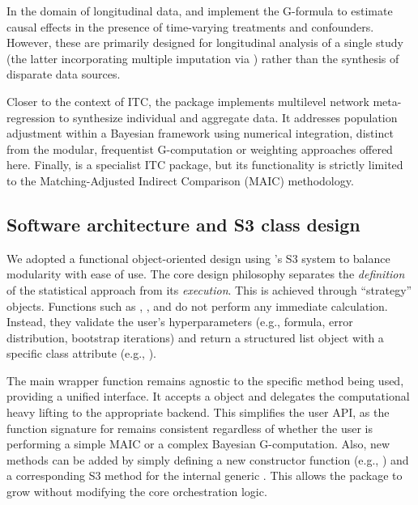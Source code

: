 \documentclass[article]{jss}
\begin{document}
In the domain of longitudinal data,  \citep{sjolander2023gformula} and  \citep{Sterne2023} implement the G-formula to estimate causal effects in the presence of time-varying treatments and confounders. However, these are primarily designed for longitudinal analysis of a single study (the latter incorporating multiple imputation via ) rather than the synthesis of disparate data sources.

Closer to the context of ITC, the  package \citep{phillippo_multinma_2020} implements multilevel network meta-regression to synthesize individual and aggregate data. It addresses population adjustment within a Bayesian framework using numerical integration, distinct from the modular, frequentist G-computation or weighting approaches offered here. Finally,  \citep{maicplus_2024} is a specialist ITC package, but its functionality is strictly limited to the Matching-Adjusted Indirect Comparison (MAIC) methodology.


\subsection{Software architecture and S3 class design}
We adopted a functional object-oriented design using 's S3 system to balance modularity with ease of use. The core design philosophy separates the \emph{definition} of the statistical approach from its \emph{execution}.
This is achieved through ``strategy'' objects. Functions such as , , and  do not perform any immediate calculation. Instead, they validate the user's hyperparameters (e.g., formula, error distribution, bootstrap iterations) and return a structured list object with a specific class attribute (e.g., ).

The main wrapper function  remains agnostic to the specific method being used, providing a unified interface. It accepts a  object and delegates the computational heavy lifting to the appropriate backend. This simplifies the user API, as the function signature for  remains consistent regardless of whether the user is performing a simple MAIC or a complex Bayesian G-computation. Also, new methods can be added by simply defining a new constructor function (e.g., ) and a corresponding S3 method for the internal generic . This allows the package to grow without modifying the core orchestration logic.
\end{document}
